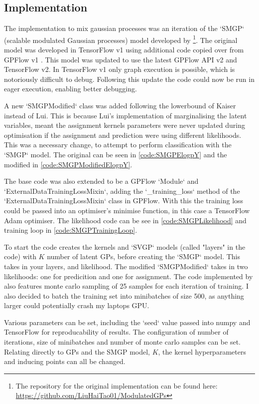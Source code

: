 \documentclass[12pt,a4paper]{report}
\theoremstyle{definition}
\begin{document}
\subsection{Implementation}

The implementation to mix gaussian processes was an iteration of the `SMGP` (scalable modulated Gaussian processes) model developed by \citet{Lui2021} \footnote{The repository for the original implementation can be found here: \url{https://github.com/LiuHaiTao01/ModulatedGPs}}.
The original model was developed in TensorFlow v1 using additional code copied over from GPFlow v1 \citep{GPflow2017}.
This model was updated to use the latest GPFlow API v2 and TensorFlow v2.
In TensorFlow v1 only graph execution is possible, which is notoriously difficult to debug.
Following this update the code could now be run in eager execution, enabling better debugging.

A new `SMGPModified` class was added following the lowerbound of Kaiser instead of Lui.
This is because Lui's implementation of marginalising the latent variables, meant the assignment kernels parameters were never updated during optimisation if the assignment and prediction were using different likelihoods.
This was a necessary change, to attempt to perform classification with the `SMGP` model.
The original can be seen in \ref{code:SMGPElogpY} and the modified in \ref{code:SMGPModifiedElogpY}.

The base code was also extended to be a GPFlow `Module` and `ExternalDataTrainingLossMixin`, adding the `_training_loss` method of the `ExternalDataTrainingLossMixin` class in GPFlow.
With this the training loss could be passed into an optimiser's minimise function, in this case a TensorFlow Adam optimiser.
The likelihood code can be see in \ref{code:SMGPLikelihood} and training loop in \ref{code:SMGPTrainingLoop}.

To start the code creates the kernels and `SVGP` models (called "layers" in the code) with $K$ number of latent GPs, before creating the `SMGP` model.
This takes in your layers, and likelihood.
The modified `SMGPModified` takes in two likelihoods: one for predicition and one for assignment.
The code implemented by \citet{Lui2021} also features monte carlo sampling of 25 samples for each iteration of training.
I also decided to batch the training set into minibatches of size 500, as anything larger could potentially crash my laptops GPU.

Various parameters can be set, including the `seed` value passed into numpy and TensorFlow for reproducability of results.
The configuration of number of iterations, size of minibatches and number of monte carlo samples can be set.
Relating directly to GPs and the SMGP model, $K$, the kernel hyperparameters and inducing points can all be changed.
\end{document}
